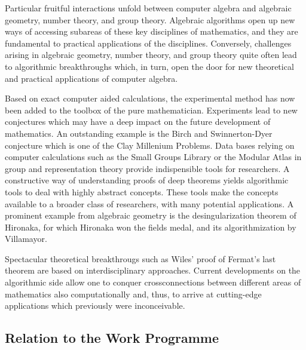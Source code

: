 \documentclass[a4paper,11pt]{article}
\begin{document}
Particular fruitful interactions unfold between computer algebra and
algebraic geometry, number theory, and group theory. Algebraic algorithms
open up new ways of accessing subareas of these key disciplines of
mathematics, and they are fundamental to practical applications of the
disciplines. Conversely, challenges arising in algebraic geometry, number
theory, and group theory quite often lead to algorithmic breakthroughs
which, in turn, open the door for new theoretical and practical applications
of computer algebra.

Based on exact computer aided calculations, the experimental method has
now been added to the toolbox of the pure mathematician. Experiments
lead to new conjectures which may have a deep impact on the future
development of mathematics. An outstanding example is the Birch and
Swinnerton-Dyer conjecture which is one of the Clay Millenium Problems.
Data bases relying on computer calculations such as the Small Groups
Library or the Modular Atlas in group and representation theory provide
indispensible tools for researchers. A constructive way of understanding
proofs of deep theorems yields algorithmic tools to deal with highly abstract
concepts. These tools make the concepts available to a broader class of
researchers, with many potential applications. A prominent example from
algebraic geometry is the desingularization theorem of Hironaka, for which
Hironaka won the fields medal, and its algorithmization by Villamayor.

Spectacular theoretical breakthrougs such as Wiles' proof of Fermat's last
theorem are based on interdisciplinary approaches. Current developments
on the algorithmic side allow one to conquer crossconnections between
different areas of mathematics also computationally and, thus, to
arrive at cutting-edge applications which previously were inconceivable.





\draftpage

\subsection{Relation to the Work Programme}


\eucommentary{
  
}
\end{document}
